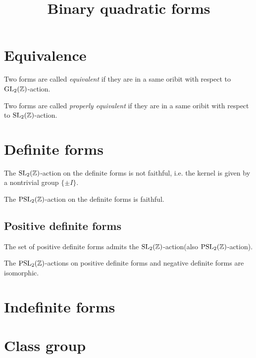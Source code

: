 \documentclass{../exp}
\title{Binary quadratic forms}
\begin{document}
\maketitle

\section{Equivalence}


\begin{defn}
Two forms are called \emph{equivalent} if they are in a same oribit with respect to $\mathrm{GL}_2(\mathbb{Z})$-action.
\end{defn}

\begin{defn}
Two forms are called \emph{properly equivalent} if they are in a same oribit with respect to $\mathrm{SL}_2(\mathbb{Z})$-action.
\end{defn}


\section{Definite forms}


\begin{prop}
The $\mathrm{SL}_2(\mathbb{Z})$-action on the definite forms is not faithful, i.e. the kernel is given by a nontrivial group $\{\pm I\}$.
\end{prop}
\begin{prop}
The $\mathrm{PSL}_2(\mathbb{Z})$-action on the definite forms is faithful.
\end{prop}

\subsection{Positive definite forms}
\begin{prop}
The set of positive definite forms admits the $\mathrm{SL}_2(\mathbb{Z})$-action(also $\mathrm{PSL}_2(\mathbb{Z})$-action).
\end{prop}
\begin{prop}
The $\mathrm{PSL}_2(\mathbb{Z})$-actions on positive definite forms and negative definite forms are isomorphic.
\end{prop}

\section{Indefinite forms}


\section{Class group}
\end{document}
